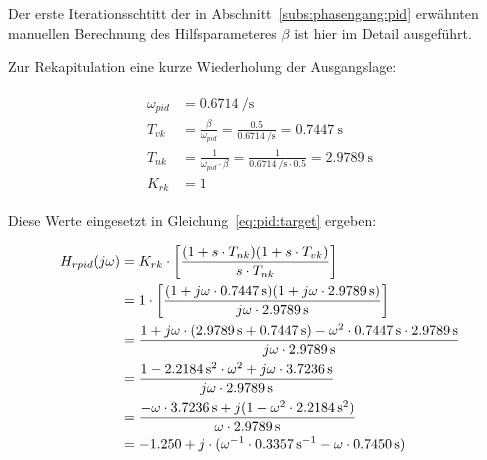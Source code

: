Der   erste  Iterationsschtitt   der  in   Abschnitt~\ref{subs:phasengang:pid}
erw\"ahnten  manuellen Berechnung  des  Hilfsparameteres $\beta$  ist hier  im
Detail ausgef\"uhrt.

Zur  Rekapitulation   eine  kurze   Wiederholung  der   Ausgangslage:

\begin{gather} \label{eq:app:recap}
    \begin{split}
        \omega_{pid} & = \SI{0.6714}{\per\second} \\
        {T_{vk}}     & = \frac{\beta}{\omega_{pid}}  = \frac{0.5}{\SI{0.6714}{\per\second}}                   = \SI{0.7447}{\second} \\
        {T_{nk}}     & = \frac{1}{\omega_{pid} \cdot \beta} = \frac{1}{\SI{0.6714}{\per\second} \cdot 0.5 }  = \SI{2.9789}{\second}  \\
        K_{rk}       & = 1
    \end{split}
\end{gather}

Diese Werte eingesetzt in Gleichung~\ref{eq:pid:target} ergeben:

\begin{gather} \label{eq:app:h_rpid:start}
    \begin{split}
        H_{rpid}(j\omega)
                 & = K_{rk} \cdot \biggl[ \frac{(1 + s       \cdot T_{nk}              ) (1 + s       \cdot T_{vk}              )}{ s       \cdot T_{nk} }              \biggr] \\
                 & =      1 \cdot \biggl[ \frac{(1 + j\omega \cdot \SI{0.7447}{\second}) (1 + j\omega \cdot \SI{2.9789}{\second})}{ j\omega \cdot \SI{2.9789}{\second}} \biggr] \\
                 & = \frac{%
                                1
                                +
                                j\omega
                                \cdot (
                                          \SI{2.9789}{\second}
                                          +
                                          \SI{0.7447}{\second}
                                      )
                                -
                                \omega^2
                                \cdot
                                \SI{0.7447}{\second}
                                \cdot
                                \SI{2.9789}{\second}
                           }{%
                                j\omega
                                \cdot
                                \SI{2.9789}{\second}
                           } \\
                 & = \frac{1 - \SI{2.2184}{\square\second} \cdot \omega^2 + j\omega \cdot \SI{3.7236}{\second}}{j\omega \cdot \SI{2.9789}{\second}} \\
                 & = \frac{-\omega \cdot \SI{3.7236}{\second} + j (1 - \omega^2 \cdot \SI{2.2184}{\square\second})}{\omega \cdot \SI{2.9789}{\second}} \\
                 & = -1.250 + j \cdot (\omega^{-1} \cdot \SI{0.3357}{\per\second} - \omega \cdot \SI{0.7450}{\second})
    \end{split}
\end{gather}

